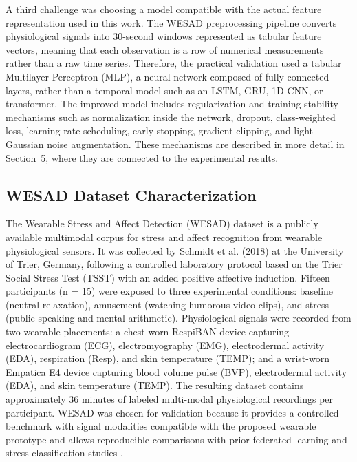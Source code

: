 \documentclass[12pt]{article}
\begin{document}
A third challenge was choosing a model compatible with the actual feature representation used in this work. The WESAD preprocessing pipeline converts physiological signals into 30-second windows represented as tabular feature vectors, meaning that each observation is a row of numerical measurements rather than a raw time series. Therefore, the practical validation used a tabular Multilayer Perceptron (MLP), a neural network composed of fully connected layers, rather than a temporal model such as an LSTM, GRU, 1D-CNN, or transformer. The improved model includes regularization and training-stability mechanisms such as normalization inside the network, dropout, class-weighted loss, learning-rate scheduling, early stopping, gradient clipping, and light Gaussian noise augmentation. These mechanisms are described in more detail in Section~5, where they are connected to the experimental results.

\subsection{WESAD Dataset Characterization}

The Wearable Stress and Affect Detection (WESAD) dataset \cite{philip_schmidt_382e77a1} is a publicly available multimodal corpus for stress and affect recognition from wearable physiological sensors. It was collected by Schmidt et al. (2018) at the University of Trier, Germany, following a controlled laboratory protocol based on the Trier Social Stress Test (TSST) with an added positive affective induction. Fifteen participants (n = 15) were exposed to three experimental conditions: baseline (neutral relaxation), amusement (watching humorous video clips), and stress (public speaking and mental arithmetic). Physiological signals were recorded from two wearable placements: a chest-worn RespiBAN device capturing electrocardiogram (ECG), electromyography (EMG), electrodermal activity (EDA), respiration (Resp), and skin temperature (TEMP); and a wrist-worn Empatica E4 device capturing blood volume pulse (BVP), electrodermal activity (EDA), and skin temperature (TEMP). The resulting dataset contains approximately 36 minutes of labeled multi-modal physiological recordings per participant. WESAD was chosen for validation because it provides a controlled benchmark with signal modalities compatible with the proposed wearable prototype and allows reproducible comparisons with prior federated learning and stress classification studies \cite{abdulrahman_alahmadi_32bc288c, ahmad_almadhor_8cc2e670, neha_gahlan_d8b04f5d}.
\end{document}
